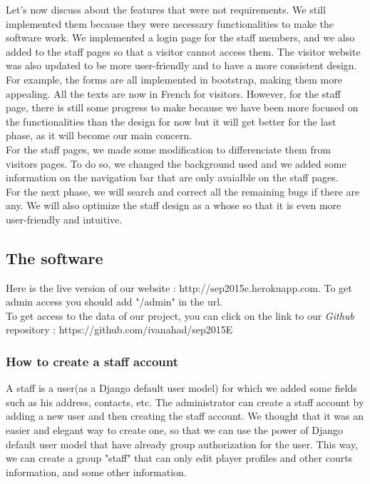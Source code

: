 \documentclass[a4paper, 12pt]{article}
\begin{document}
Let's now discuss about the features that were not requirements. We still implemented them because they were necessary functionalities to make the software work. We implemented a login page for the staff members, and we also added to the staff pages so that a visitor cannot access them. The visitor website was also updated to be more user-friendly and to have a more consistent design. For example, the forms are all implemented in bootstrap, making them more appealing. All the texts are now in French for visitors. However, for the staff page, there is still some progress to make because we have been more focused on the functionalities than the design for now but it will get better for the last phase, as it will become our main concern. \\

For the staff pages, we made some modification to differenciate them from visitors pages. To do so, we changed the background used and we added some information on the navigation bar that are only avaialble on the staff pages.\\

For the next phase, we will search and correct all the remaining bugs if there are any. We will also optimize the staff design as a whose so that it is even more user-friendly and intuitive. 
\subsection{The software}


Here is the live version of our website : http://sep2015e.herokuapp.com.  To get admin access you should add "/admin" in the url.\\

To get access to the data of our project, you can click on the link to our \textit{Github} repository : https://github.com/ivanahad/sep2015E\\
\subsubsection*{How to create a staff account}
A staff is a user(as a Django default user model) for which we added some fields such as his address, contacts, etc. The administrator can create a staff account by adding a new user and then creating the staff account. We thought that it was an easier and elegant way to create one, so that we can use the power of Django default user model that have already group authorization for the user. This way, we can create a group "staff" that can only edit player profiles and other courts information, and some other information. 
\end{document}
